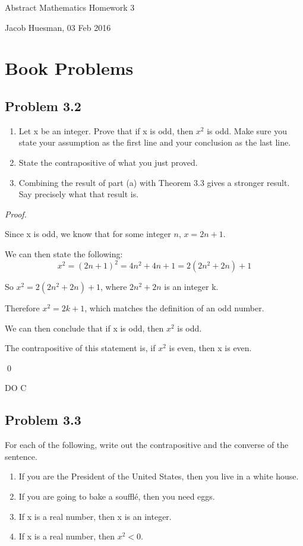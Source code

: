 \documentclass{article}
\begin{document}
\centerline{\sc \large Abstract Mathematics Homework 3}
\vspace{.5pc}
\centerline{\sc Jacob Huesman, 03 Feb 2016}

\vspace{2pc}


\section{Book Problems}
\subsection{Problem 3.2}
\renewcommand{\labelenumi}{(\alph{enumi})}
\begin{enumerate}
	\item Let x be an integer. Prove that if x is odd, then $x^2$ is odd. Make sure you state your assumption as the first line and your conclusion as the last line.	
	\item State the contrapositive of what you just proved.
	\item Combining the result of part (a) with Theorem 3.3 gives a stronger result. Say precisely what that result is.
\end{enumerate}
	
\textit{Proof.}
\begin{addmargin}[0.75cm]{0cm}
	Since x is odd, we know that for some integer $n$, $x=2n+1$.
	
	We can then state the following:
	\begin{equation}
		x^2 = (2n+1)^2 = 4n^2+4n+1 
		= 2(2n^2+2n)+1
	\end{equation}
	
	So $x^2 = 2(2n^2 + 2n) + 1$, where $2n^2 + 2n$ is an integer k.
	
	Therefore $x^2=2k+1$, which matches the definition of an odd number.
	
	We can then conclude that if x is odd, then $x^2$ is odd.
	
	The contrapositive of this statement is, if $x^2$ is even, then x is even.

	\qed
\end{addmargin}

DO C


\pagebreak
\subsection{Problem 3.3}
For each of the following, write out the contrapositive and the converse of the sentence.
\begin{enumerate}
	\item If you are the President of the United States, then you live in a white house.
	\item If you are going to bake a souffl\'e, then you need eggs.
	\item If x is a real number, then x is an integer.
	\item If x is a real number, then $x^2<0$.
\end{enumerate}
\end{document}
